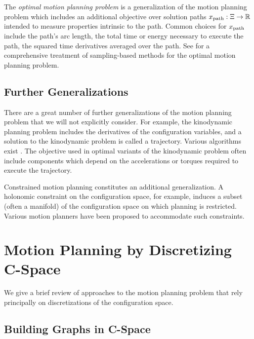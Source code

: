 The \emph{optimal motion planning problem}
is a generalization of the motion planning problem which
includes an additional objective over solution paths
$x_{\mbox{\scriptsize path}} : \Xi \rightarrow \mathbb{R}$
intended to measure properties intrinsic to the path.
Common choices for $x_{\mbox{\scriptsize path}}$ include
the path's arc length,
the total time or energy necessary to execute the path,
the squared time derivatives averaged over the path.
See \citep{karaman2011samplingoptimal} for a comprehensive treatment
of sampling-based methods for the optimal motion planning problem.


\subsection{Further Generalizations}

There are a great number of further generalizations of the
motion planning problem that we will not explicitly consider.
For example,
the kinodynamic planning problem includes the derivatives of the
configuration variables,
and a solution to the kinodynamic problem is called a trajectory.
Various algorithms exist \citep{lavallekuffner1999rrt}.
The objective used in optimal variants of the kinodynamic problem
often include components which depend on the accelerations or torques
required to execute the trajectory.

Constrained motion planning constitutes an additional generalization.
A holonomic constraint on the configuration space,
for example,
induces a subset (often a manifold) of the configuration space
on which planning is restricted.
Various motion planners \citep{berenson2009manifolds}
have been proposed to accommodate such constraints.

\section{Motion Planning by Discretizing C-Space}

We give a brief review of approaches to the motion planning problem
that rely principally on discretizations of the configuration space.

\subsection{Building Graphs in C-Space}
\label{subsec:roadmaps:building-graphs}

